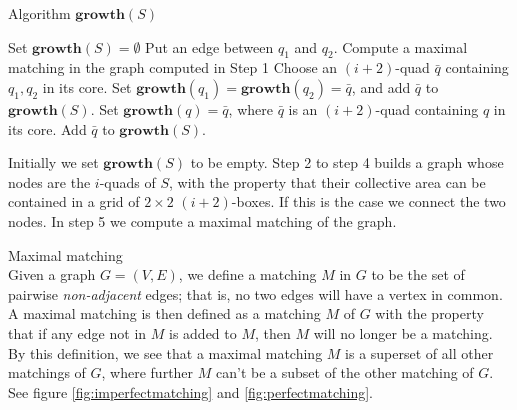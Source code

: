 \begin{algorithm}[H]
	\caption{Algorithm $\mathbf{growth}(S)$} 
	\begin{algorithmic}[1]
		\State Set $\mathbf{growth}(S)=\emptyset$
                \State Put an edge between $q_1$ and $q_2$.
            \EndIf
        \EndFor
        \State Compute a maximal matching in the graph computed in Step 1
        	\State Choose an $(i+2)$-quad $\bar{q}$ containing $q_1, q_2$ in its core.
            \State Set $\mathbf{growth}(q_1)=\mathbf{growth}(q_2)=\bar{q}$, and add 
            	   $\bar{q}$ to $\mathbf{growth}(S)$.
        \EndFor
        	\State Set $\mathbf{growth}(q)=\bar{q}$, where $\bar{q}$ is an $(i+2)$-quad 
            	   containing $q$ in its core.
            \State Add $\bar{q}$ to $\mathbf{growth}(S)$.
        \EndFor
	\end{algorithmic} 
\end{algorithm}

Initially we set $\mathbf{growth}(S)$ to be empty. Step 2 to step 4 builds a graph whose 
nodes are the $i$-quads of $S$, with the property that their collective area can be contained 
in a grid of $2 \times 2$ $(i+2)$-boxes. If this is the case we connect the two nodes. In step 
5 we compute a maximal matching of the graph.

\begin{mydef} {Maximal matching} \\
Given a graph $G = (V,E)$, we define a matching $M$ in $G$ to be the set of pairwise 
\textit{non-adjacent} edges; that is, no two edges will have a vertex in common. A maximal 
matching is then defined as a matching $M$ of $G$ with the property that if any edge not in 
$M$ is added to $M$, then $M$ will no longer be a matching. By this definition, we see that 
a maximal matching $M$ is a superset of all other matchings of $G$, where further $M$ can't 
be a subset of the other matching of $G$. See figure \ref{fig:imperfectmatching} and 
\ref{fig:perfectmatching}\cite{IntroToAlg}.
\end{mydef}

